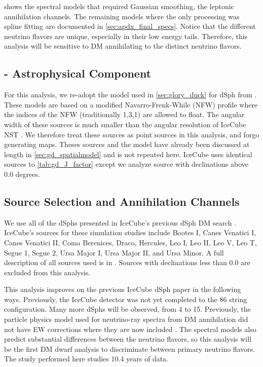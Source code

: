 shows the spectral models that required Gaussian smoothing, the leptonic annihilation channels.
The remaining models where the only processing was spline fitting are documented in \cref{sec:apdx_final_specs}.
Notice that the different neutrino flavors are unique, especially in their low energy tails.
Therefore, this analysis will be sensitive to DM annihilating to the distinct neutrino flavors.

\subsection{\J - Astrophysical Component}\label{sec:icDM_spatialmodel}

For this analysis, we re-adopt the \GS model used in \cref{sec:glory_duck} for dSph from \cite{Geringer_Sameth_2015}.
These models are based on a modified Navarro-Frenk-While (NFW) profile where the indices of the NFW (traditionally 1,3,1) are allowed to float.
The angular width of these sources is much smaller than the angular resolution of IceCube NST \cite{IC_NGC1068}.
We therefore treat these sources as point sources in this analysis, and forgo generating maps.
Theses sources and the \GS model have already been discussed at length in \cref{sec:gd_spatialmodel} and is not repeated here.
IceCube uses identical sources to \cref{tab:gd_J_factor} except we analyze source with declinations above 0.0 degrees.

\subsection{Source Selection and Annihilation Channels}\label{sec:ic3_study_selection}

We use all of the dSphs presented in IceCube's previous dSph DM search \cite{IC3_DM2013}.
IceCube's sources for these simulation studies include Bootes I, Canes Venatici I, Canes Venatici II, Coma Berenices, Draco, Hercules, Leo I, Leo II, Leo V, Leo T, Segue 1, Segue 2, Ursa Major I, Ursa Major II,  and Ursa Minor.
A full description of all sources used is in .
Sources with declinations less than 0.0 are excluded from this analysis.

This analysis improves on the previous IceCube dSph paper \cite{IC3_DM2013} in the following ways.
Previously, the IceCube detector was not yet completed to the 86 string configuration.
Many more dSphs will be observed, from 4 to 15.
Previously, the particle physics model used for neutrino-ray spectra from DM annihilation did not have EW corrections where they are now included \cite{HDMSpectra}.
The spectral models also predict substantial differences between the neutrino flavors, so this analysis will be the first DM dwarf analysis to discriminate between primary neutrino flavors.
The study performed here studies 10.4 years of data.

